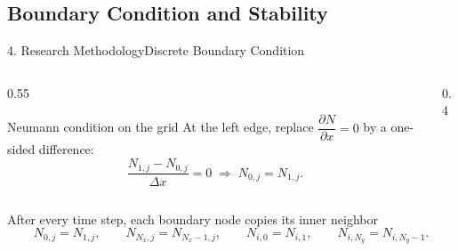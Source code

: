\documentclass[10pt]{beamer}
\begin{document}
  \subsection{Boundary Condition and Stability}
    \begin{frame}{4. Research Methodology}{Discrete Boundary Condition}
      \begin{columns}[c]
        \begin{column}{0.55\textwidth}
          \begin{block}{Neumann condition on the grid}
              At the left edge, replace $\dfrac{\partial N}{\partial x} = 0$ by a one-sided difference:
              $$
              \frac{N_{1,j} - N_{0,j}}{\Delta x} = 0
              \;\Longrightarrow\;
              N_{0,j} = N_{1,j}.
              $$
          \end{block}
        \end{column}
        \begin{column}{0.4\textwidth}
          \begin{center}
          \end{center}
        \end{column}
      \end{columns}
      \vspace{0.3cm}
      \begin{block}{After every time step, each boundary node copies its inner neighbor}
          $$
          N_{0,j} = N_{1,j},\qquad
          N_{N_x,j} = N_{N_x-1,j},\qquad
          N_{i,0} = N_{i,1},\qquad
          N_{i,N_y} = N_{i,N_y-1}.
          $$
      \end{block}
    \end{frame}
\end{document}
